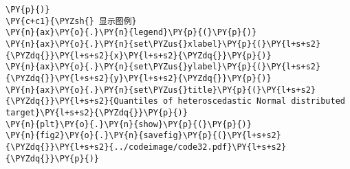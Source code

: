 \begin{Verbatim}[commandchars=\\\{\}]
\PY{p}{)}
\PY{c+c1}{\PYZsh{} 显示图例}
\PY{n}{ax}\PY{o}{.}\PY{n}{legend}\PY{p}{(}\PY{p}{)}
\PY{n}{ax}\PY{o}{.}\PY{n}{set\PYZus{}xlabel}\PY{p}{(}\PY{l+s+s2}{\PYZdq{}}\PY{l+s+s2}{x}\PY{l+s+s2}{\PYZdq{}}\PY{p}{)}
\PY{n}{ax}\PY{o}{.}\PY{n}{set\PYZus{}ylabel}\PY{p}{(}\PY{l+s+s2}{\PYZdq{}}\PY{l+s+s2}{y}\PY{l+s+s2}{\PYZdq{}}\PY{p}{)}
\PY{n}{ax}\PY{o}{.}\PY{n}{set\PYZus{}title}\PY{p}{(}\PY{l+s+s2}{\PYZdq{}}\PY{l+s+s2}{Quantiles of heteroscedastic Normal distributed target}\PY{l+s+s2}{\PYZdq{}}\PY{p}{)}
\PY{n}{plt}\PY{o}{.}\PY{n}{show}\PY{p}{(}\PY{p}{)}
\PY{n}{fig2}\PY{o}{.}\PY{n}{savefig}\PY{p}{(}\PY{l+s+s2}{\PYZdq{}}\PY{l+s+s2}{../codeimage/code32.pdf}\PY{l+s+s2}{\PYZdq{}}\PY{p}{)}
\end{Verbatim}
